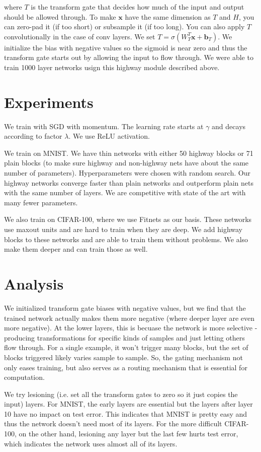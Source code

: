 \documentclass[a4paper]{article}
\begin{document}
where $T$ is the transform gate that decides how much of the input and output
should be allowed through. To make $\bm{x}$ have the same dimension as $T$
and $H$, you can zero-pad it (if too short) or subsample it (if too long).
You can also apply $T$ convolutionally in the case of conv layers. We set
$T = \sigma(W_T^T \bm{x} + \bm{b}_T)$. We initialize the bias with negative
values so the sigmoid is near zero and thus the transform gate starts out by
allowing the input to flow through. We were able to train 1000 layer networks
usign this highway module described above.

\section{Experiments}
We train with SGD with momentum. The learning rate starts at $\gamma$ and decays
according to factor $\lambda$. We use ReLU activation.

We train on MNIST. We have thin networks with either 50 highway blocks or 71
plain blocks (to make sure highway and non-highway nets have about the same
number of parameters). Hyperparameters were chosen with random search. Our
highway networks converge faster than plain networks and outperform plain nets
with the same number of layers. We are competitive with state of the art with
many fewer parameters.

We also train on CIFAR-100, where we use Fitnets as our basis. These networks
use maxout units and are hard to train when they are deep. We add highway
blocks to these networks and are able to train them without problems. We also
make them deeper and can train those as well.

\section{Analysis}
We initialized transform gate biases with negative values, but we find that the
trained network actually makes them more negative (where deeper layer are even
more negative). At the lower layers, this is becuase the network is more
selective - producing transformations for specific kinds of samples and just
letting others flow through. For a single example, it won't trigger many blocks,
but the set of blocks triggered likely varies sample to sample. So, the
gating mechanism not only eases training, but also serves as a routing mechanism
that is essential for computation.

We try lesioning (i.e. set all the transform gates to zero so it just copies
the input) layers. For MNIST, the early layers are essential but the
layers after layer 10 have no impact on test error. This indicates that MNIST
is pretty easy and thus the network doesn't need most of its layers. For the
more difficult CIFAR-100, on the other hand, lesioning any layer but the last
few hurts test error, which indicates the network uses almost all of its layers.
\end{document}
